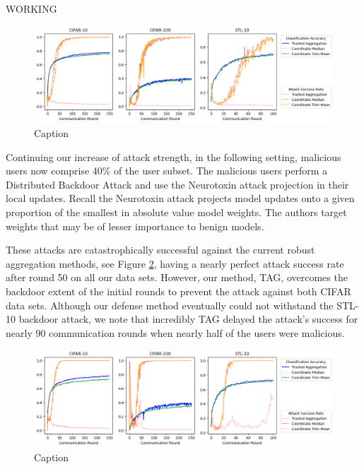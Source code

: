 \documentclass{article} %
\begin{document}
WORKING

\begin{figure}[H]
    \centering
    \includegraphics[width=\textwidth]{make_article/make_visuals/visuals/accuracy--n_malicious2--dba1--beta0.2.png}
    \caption{Caption}
    \label{fig: accuracy--dba1--n_malicious2}
\end{figure}

Continuing our increase of attack strength, in the following setting, malicious users now comprise 40\% of the user subset. The malicious users perform a Distributed Backdoor Attack and use the Neurotoxin attack projection in their local updates. Recall the Neurotoxin attack projects model updates onto a given proportion of the smallest in absolute value model weights. The authors \cite{neurotoxin} target weights that may be of lesser importance to benign models. 

These attacks are catastrophically successful against the current robust aggregation methods, see Figure \ref{fig: accuracy--dba1--n_malicious4--neuro1}, having a nearly perfect attack success rate after round 50 on all our data sets. However, our method, TAG, overcomes the backdoor extent of the initial rounds to prevent the attack against both CIFAR data sets. Although our defense method eventually could not withstand the STL-10 backdoor attack, we note that incredibly TAG delayed the attack's success for nearly 90 communication rounds when nearly half of the users were malicious.

\begin{figure}[H]
    \centering
    \includegraphics[width=\textwidth]{make_article/make_visuals/visuals/accuracy--n_malicious4--dba1--beta0.2--neuro_p0.1.png}
    \caption{Caption}
    \label{fig: accuracy--dba1--n_malicious4--neuro1}
\end{figure}
\end{document}
